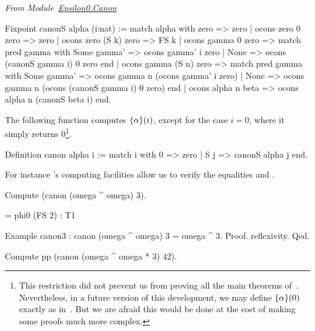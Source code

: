 \documentclass[a4paper]{book}
\begin{document}
\vspace{4pt}
\emph{From Module~\href{../src/html/hydras.Epsilon0.Canon.html\#canonS}{Epsilon0.Canon}}

\label{Functions:canonS}
\label{Functions:canon}
\begin{Coqsrc}
Fixpoint canonS alpha (i:nat) :=
  match alpha with
      zero => zero
    | ocons zero 0 zero => zero
    | ocons zero (S k) zero => FS k
    | ocons gamma 0 zero =>
      match pred gamma with
          Some gamma' => ocons gamma' i zero
        | None => ocons (canonS gamma i) 0 zero
      end
    | ocons gamma (S n) zero =>
       match pred gamma with
           Some gamma' => ocons gamma n (ocons gamma' i zero)
         | None => ocons gamma n (ocons (canonS gamma i) 0 zero)
       end
    | ocons alpha n beta => ocons alpha n (canonS beta i)
  end.
\end{Coqsrc}


The following function computes $\mbox{$\{\alpha\}(i)$}$, except for the case $i=0$, where it simply returns $0$\;\footnote{This restriction did not prevent us from proving all the main theorems of~\cite{KS81, KP82}. Nevertheless, in a future version of this development, we may define $\mbox{$\{\alpha\}(0)$}$ exactly as 
in~\cite{KS81}. But we are afraid this would  be done at the cost of making some proofs much more complex.}.

\begin{Coqsrc}
 Definition canon alpha i := 
   match i with 0 => zero | S j => canonS alpha j end. 
\end{Coqsrc}

For instance \coq's computing facilities allow us to verify the equalities\linebreak 
{} and
.


\begin{Coqsrc}
Compute (canon (omega ^ omega) 3).
\end{Coqsrc}

\begin{Coqanswer}
  = phi0 (FS 2) : T1
\end{Coqanswer}

\begin{Coqsrc}
Example canon3 :  canon (omega ^ omega) 3 = omega ^ 3.
Proof. reflexivity. Qed.
\end{Coqsrc}


\begin{Coqsrc}
Compute pp (canon (omega ^ omega * 3) 42).  
\end{Coqsrc}
\end{document}
